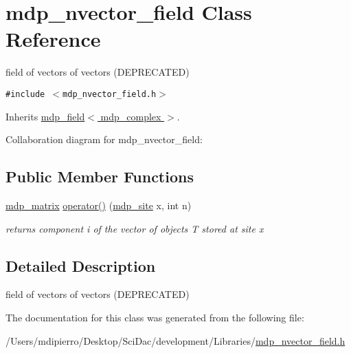 \hypertarget{classmdp__nvector__field}{
\section{mdp\_\-nvector\_\-field Class Reference}
\label{classmdp__nvector__field}
}
field of vectors of vectors (DEPRECATED)  


{\tt \#include $<$mdp\_\-nvector\_\-field.h$>$}

Inherits \hyperlink{classmdp__field}{mdp\_\-field$<$ mdp\_\-complex $>$}.

Collaboration diagram for mdp\_\-nvector\_\-field:\subsection*{Public Member Functions}
\begin{CompactItemize}
\item 
\hypertarget{classmdp__nvector__field_fddf6115e2d88a72727d66949436d8ca}{
\hyperlink{classmdp__matrix}{mdp\_\-matrix} \hyperlink{classmdp__nvector__field_fddf6115e2d88a72727d66949436d8ca}{operator()} (\hyperlink{classmdp__site}{mdp\_\-site} x, int n)}
\label{classmdp__nvector__field_fddf6115e2d88a72727d66949436d8ca}

\begin{CompactList}\small\item\em returns component i of the vector of objects T stored at site x \item\end{CompactList}\end{CompactItemize}


\subsection{Detailed Description}
field of vectors of vectors (DEPRECATED) 

The documentation for this class was generated from the following file:\begin{CompactItemize}
\item 
/Users/mdipierro/Desktop/SciDac/development/Libraries/\hyperlink{mdp__nvector__field_8h}{mdp\_\-nvector\_\-field.h}\end{CompactItemize}
